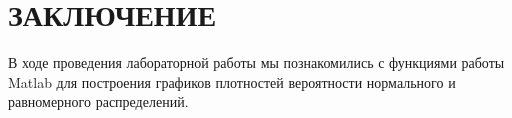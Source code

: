 \section*{ЗАКЛЮЧЕНИЕ}

В ходе проведения лабораторной работы мы познакомились с функциями работы
Matlab для построения графиков плотностей вероятности нормального и равномерного распределений.

\newpage

